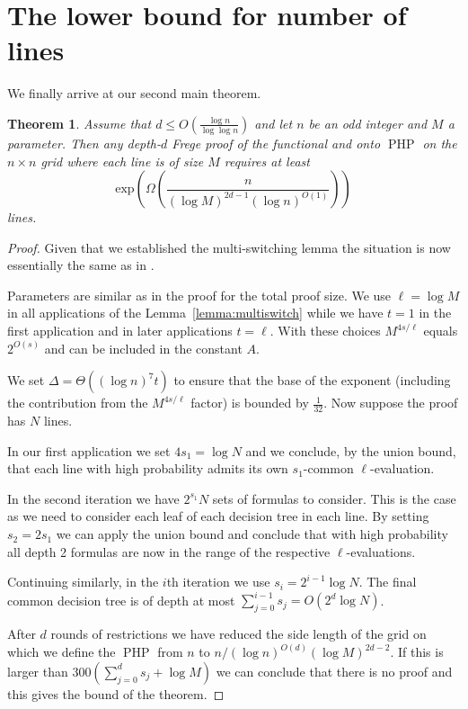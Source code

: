 \documentclass{article}\usepackage[a4paper,margin=20mm]{geometry}
\newtheorem{theorem}{Theorem}\newtheorem{lemma}[theorem]{Lemma}\newtheorem{proposition}[theorem]{Proposition}\newtheorem{corollary}[theorem]{Corollary}\newtheorem{definition}[theorem]{Definition}\newtheorem{claim}[theorem]{Claim}\newtheorem{remark}[theorem]{Remark}\newtheorem{observation}[theorem]{Observation}\newtheorem{conjecture}[theorem]{Conjecture}\newtheorem{example}[theorem]{Example}
\DeclareMathOperator{\PHP}{PHP}
\begin{document}
\section{The lower bound for number of
lines}\label{sec:nlines}

We finally arrive at our second main theorem.


\begin{theorem}\label{thm:lines}
Assume that $d \leq O(\frac{\log n}{\log {\log n}})$ and let
$n$ be an odd integer and $M$ a parameter. 
Then any depth-$d$ Frege proof of
the functional and onto $\PHP$ on the $n \times n$ grid where each line
is of size $M$ requires at least
$$
\mbox{exp} \left(\Omega \left(\frac {n}{(\log M)^{2d-1} (\log n)^{O(1)}}\right)\right)
$$
lines.
\end{theorem}


\begin{proof}
Given that we established the multi-switching lemma
the situation is now essentially the same as 
in \cite{jhkr}.  

Parameters are similar as in the proof for the total proof
size.   We use $\ell= \log M$ in all applications
of the Lemma~\ref{lemma:multiswitch}
while we have $t=1$ in the
first application and in later applications $t=\ell$.
With these choices $M^{4s /\ell}$ equals
$2^{O(s)}$ and can be included in the constant $A$.

We set $\Delta = \Theta ((\log n)^7 t)$ to ensure that the 
base of the exponent (including the contribution from the $M^{4s/ \ell}$
factor) is bounded by $\frac 1{32}$.  Now suppose the
proof has $N$ lines.  

In our first application we set $4s_1= \log N$ and
we conclude, by the union bound,  that each line with
high probability admits its own $s_1$-common
$\ell$-evaluation.

In the second iteration we have $2^{s_1} N $ sets of
formulas to consider.  This is the case as we need to consider
each leaf of each decision tree in each line.
By setting $s_2= 2 s_1$ we can apply the union
bound and conclude that with high probability all
depth 2 formulas are now in the range of the
respective $\ell$-evaluations.

Continuing similarly, in the $i$th iteration we use $s_i=2^{i-1} \log N$.
The final common decision tree is 
of depth at most $\sum_{j=0}^{i-1} s_j= O(2^d \log N)$.

After $d$ rounds of restrictions we have reduced the 
side length of the grid on which we define the $\PHP$ from $n$ to $n/ (\log n)^{O(d)} (\log M)^{2d-2}$.
If this is larger than $300(\sum_{j=0}^{d} s_j + \log M)$
we can conclude that there is no proof and this gives
the bound of the theorem.
\end{proof}
\end{document}
